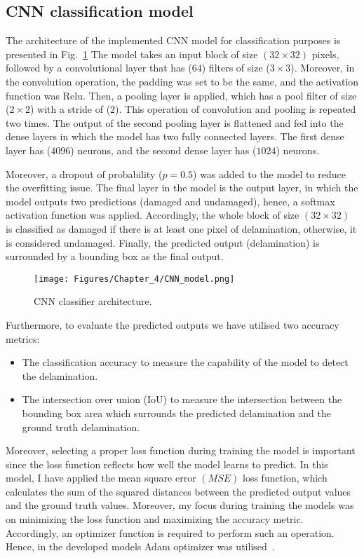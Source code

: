 \subsection{CNN classification model}
The architecture of the implemented CNN model for classification purposes is presented in Fig.~\ref{CNN_model}
The model takes an input block of size \((32\times 32)\) pixels, followed by a convolutional layer that has (\(64\)) filters of size (\(3\times 3\)).
Moreover, in the convolution operation, the padding was set to be the same,  and the activation function was Relu.
Then, a pooling layer is applied, which has a pool filter of size (\(2\times 2\)) with a stride of (\(2\)).
This operation of convolution and pooling is repeated two times.
The output of the second pooling layer is flattened and fed into the dense layers in which the model has two fully connected layers.
The first dense layer has (\(4096\)) neurons, and the second dense layer has (\(1024\)) neurons.

Moreover, a dropout of probability (\(p = 0.5\)) was added to the model to reduce the overfitting issue.
The final layer in the model is the output layer, in which the model outputs two predictions (damaged and undamaged), hence, a softmax activation function was applied. 
Accordingly, the whole block of size \((32\times 32)\) is classified as damaged if there is at least one pixel of delamination, otherwise, it is considered undamaged.
Finally, the predicted output (delamination) is surrounded by a bounding box as the final output.
\begin{figure}[h!]
	\centering
	\texttt{[image: Figures/Chapter\_4/CNN\_model.png]}
	\caption{CNN classifier architecture.}
	\label{CNN_model}
\end{figure}

Furthermore, to evaluate the predicted outputs we have utilised two accuracy metrics:
\begin{itemize}
	\item The classification accuracy to measure the capability of the model to detect the delamination.
	\item The intersection over union (IoU) to measure the intersection between the bounding box area which surrounds the predicted delamination and the ground truth delamination.
\end{itemize}

Moreover, selecting a proper loss function during training the model is important since the loss function reflects how well the model learns to predict.
In this model, I have applied the mean square error \((MSE)\) loss function, which calculates the sum of the squared distances between the predicted output values and the ground truth values.
Moreover, my focus during training the models was on minimizing the loss function and maximizing the accuracy metric.
Accordingly, an optimizer function is required to perform such an operation.
Hence, in the developed models Adam optimizer was utilised~\cite{Kingma2015}. 